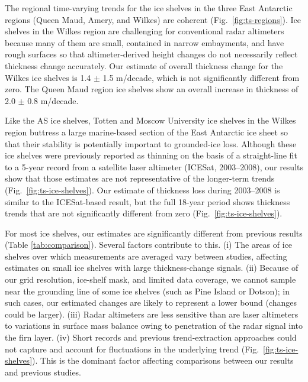 The regional time-varying trends for the ice
shelves in the three East Antarctic regions (Queen
Maud, Amery, and Wilkes) are coherent (Fig.~\ref{fig:ts-regions}).
Ice shelves in the Wilkes region are challenging
for conventional radar altimeters because many
of them are small, contained in narrow embayments,
and have rough surfaces so that altimeter-derived
height changes do not necessarily reflect
thickness change accurately. Our estimate of overall
thickness change for the Wilkes ice shelves is
1.4 $\pm$ 1.5 m/decade, which is not significantly
different from zero. The Queen Maud region ice
shelves show an overall increase in thickness of
2.0 $\pm$ 0.8 m/decade.

Like the AS ice shelves, Totten and Moscow
University ice shelves in the Wilkes region buttress
a large marine-based section of the East
Antarctic ice sheet so that their stability is potentially
important to grounded-ice loss. Although
these ice shelves were previously reported as
thinning \parencite{Pritchard2012} on the basis of a straight-line fit to
a 5-year record from a satellite laser altimeter
(ICESat, 2003--2008), our results show that those
estimates are not representative of the longer-term
trends (Fig.~\ref{fig:ts-ice-shelves}). Our estimate of thickness
loss during 2003--2008 is similar to the ICESat-based
result, but the full 18-year period shows
thickness trends that are not significantly different
from zero (Fig.~\ref{fig:ts-ice-shelves}).

For most ice shelves, our estimates are significantly
different from previous results (Table \ref{tab:comparison}).
Several factors contribute to this. (i) The areas of
ice shelves over which measurements are averaged
vary between studies, affecting estimates on
small ice shelves with large thickness-change
signals. (ii) Because of our grid resolution, ice-shelf
mask, and limited data coverage, we cannot
sample near the grounding line of some ice shelves
(such as Pine Island or Dotson); in such cases,
our estimated changes are likely to represent a
lower bound (changes could be larger). (iii) Radar
altimeters are less sensitive than are laser altimeters
to variations in surface mass balance owing
to penetration of the radar signal into the firn
layer. (iv) Short records and previous trend-extraction
approaches could not capture and account
for fluctuations in the underlying trend (Fig.~\ref{fig:ts-ice-shelves}).
This is the dominant factor affecting comparisons
between our results and previous studies.

